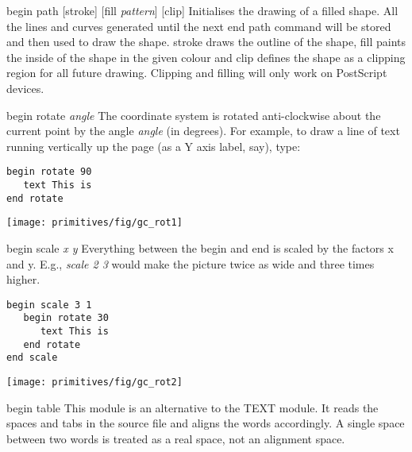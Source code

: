 \begin{commanddescription}
\item[{\sf begin path [stroke] [fill {\it pattern}] [clip]} ]
    
Initialises the drawing of a filled shape.  All the lines and curves generated
until the next {\sf end path} command will be stored and then used to draw the
shape. {\sf stroke} draws the outline of the shape, {\sf fill} paints the
inside of the shape in the given colour and {\sf clip} defines the shape
as a clipping region for all future drawing.  Clipping and filling
will only work on PostScript devices.

\item[{\sf begin rotate {\it angle}}]
 The coordinate system is rotated anti-clockwise about the current point by
the angle {\it angle} (in degrees).  For example, to draw a line of text running
vertically up the page (as a Y axis label, say), type:

\begin{minipage}[c]{8cm}
\begin{Verbatim}
begin rotate 90
   text This is
end rotate
\end{Verbatim}
\end{minipage}
\hfill
\begin{minipage}[c]{7cm}
\mbox{\texttt{[image: primitives/fig/gc\_rot1]}}
\end{minipage}

\item[{\sf begin scale {\it x y}}]
 Everything between the {\sf begin} and {\sf end} is scaled
by the factors x and y. E.g., {\it scale 2 3} would make
the picture twice as wide and three times higher.

\begin{minipage}[c]{8cm}
\begin{Verbatim}
begin scale 3 1 
   begin rotate 30
      text This is
   end rotate
end scale
\end{Verbatim}
\end{minipage}
\hfill
\begin{minipage}[c]{7cm}
\mbox{\texttt{[image: primitives/fig/gc\_rot2]}}
\end{minipage}

\pagebreak[2]

\item[{\sf begin table }]
  This module is an alternative
to the TEXT module.  It reads
the spaces and tabs in the source file and aligns the words
accordingly.  A single space between two words
is treated as a real space, not an alignment space.


\end{commanddescription}
